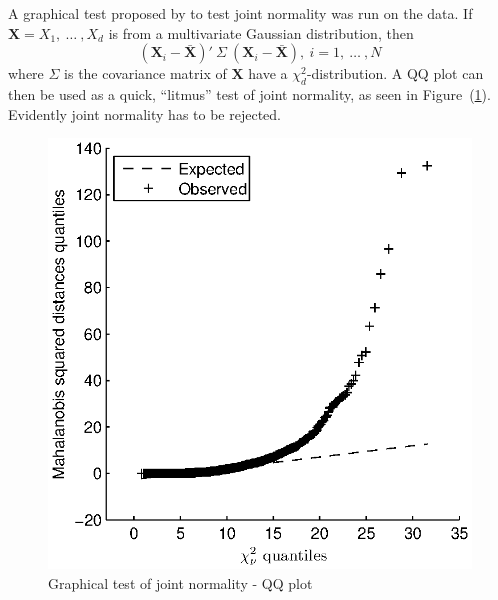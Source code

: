 A graphical test proposed by \cite{Gnanadesikan77} to test joint normality
was run on the data. If $\mathbf{X}=X_1, \ \ldots \ ,X_d$ is from a multivariate
Gaussian distribution, then
\begin{displaymath}
(\mathbf{X}_i-\bar{\mathbf{X}})' \ \Sigma \ (\mathbf{X}_i-\bar{\mathbf{X}}), \ i=1, \ \ldots \ ,N
\end{displaymath}
where $\Sigma$ is the covariance matrix of $\mathbf{X}$ have a $\chi^2_d$-distribution.
A QQ plot can then be used as a quick, ``litmus'' test of joint normality, as seen in
Figure~(\ref{mvQQplot}). Evidently joint normality has to be rejected.
\begin{figure}[htbp]
  \centerline{\includegraphics[scale=1]{mvQQplot.eps}}
   \caption{Graphical test of joint normality - QQ plot}
   \label{mvQQplot}
\end{figure}

